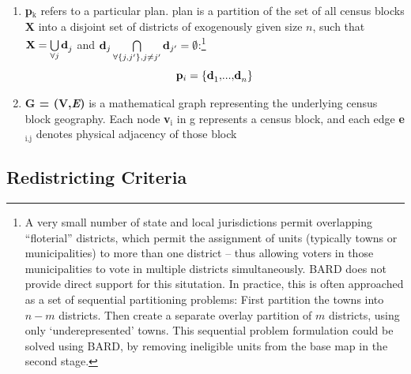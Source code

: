 \documentclass[article]{JSSstyle/jss}
\newcommand\textsubscript[1]{\ensuremath{{}_{\text{#1}}}}
\begin{document}
\begin{enumerate}
\item 
\textbf{p}\textit{\textsubscript{k}} refers to a particular plan. plan
is a partition of the set of all census blocks \textbf{X} into a disjoint set of districts of exogenously given size $n$, such that ${\bf X} = \bigcup\limits_{\forall j} {{\bf d}_j^{} }$ and ${\bf d}_j \bigcap\limits_{\forall \left\{ {j,j'} \right\},j \ne j'} {{\bf d}_{j'} }  = \emptyset$:\footnote{A very small number of state and local jurisdictions permit 
overlapping ``floterial'' districts, which permit the assignment of units (typically towns or municipalities) to more than one district -- thus allowing voters in those municipalities to vote in multiple districts simultaneously.  BARD does not provide direct support for this situtation. In practice, this is often approached as a set of sequential partitioning problems: First partition the towns into $n-m$ districts. Then create a separate overlay partition of $m$ districts, using only `underepresented' towns. This sequential problem formulation could be solved using BARD, by removing ineligible units from the base map in the second stage.}
\[
{\bf p}_i  = \left\{ {{\bf d}_1^{} {\rm ,}...{\rm ,}{\bf d}_n^{} } \right\}
\]
\item 
\textbf{G = (V,}\textbf{\textit{E}}\textbf{)} \textmd{is a mathematical
graph representing the underlying census block geography. Each} node
\textbf{v}\textit{\textsubscript{i}} in g represents a census block,
and each edge \textbf{e}\textit{\textsubscript{i,j}} denotes physical
adjacency of those block
\end{enumerate}

%
%

\subsection{Redistricting Criteria}
\end{document}
